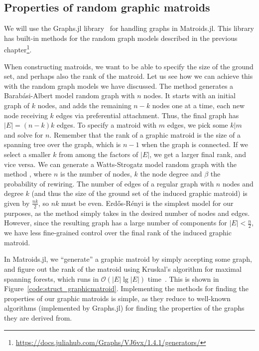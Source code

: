 \subsection{Properties of random graphic matroids}
We will use the Graphs.jl library~\cite{Graphs2021} for handling graphs in Matroids.jl. This library has built-in methods for the random graph models described in the previous chapter\footnote{\href{https://docs.juliahub.com/Graphs/VJ6vx/1.4.1/generators/}{https://docs.juliahub.com/Graphs/VJ6vx/1.4.1/generators/}}. 

When constructing matroids, we want to be able to specify the size of the ground set, and perhaps also the rank of the matroid. Let us see how we can achieve this with the random graph models we have discussed. The method  generates a Barabási-Albert model random graph with $n$ nodes. It starts with an initial graph of $k$ nodes, and adds the remaining $n-k$ nodes one at a time, each new node receiving $k$ edges via preferential attachment. Thus, the final graph has $|E| = (n-k)k$ edges. To specify a matroid with $m$ edges, we pick some $k|m$ and solve for $n$. Remember that the rank of a graphic matroid is the size of a spanning tree over the graph, which is $n-1$ when the graph is connected. If we select a smaller $k$ from among the factors of $|E|$, we get a larger final rank, and vice versa. We can generate a Watts-Strogatz model random graph with the method , where $n$ is the number of nodes, $k$ the node degree and $\beta$ the probability of rewiring. The number of edges of a regular graph with $n$ nodes and degree $k$ (and thus the size of the ground set of the induced graphic matroid) is given by $\frac{nk}{2}$, so $nk$ must be even. Erdős-Rényi is the simplest model for our purposes, as the method  simply takes in the desired number of nodes and edges. However, since the resulting graph has a large number of components for $|E| < \frac{n}{2}$, we have less fine-grained control over the final rank of the induced graphic matroid.

In Matroids.jl, we ``generate'' a graphic matroid by simply accepting some graph, and figure out the rank of the matroid using Kruskal's algorithm for maximal spanning forests, which runs in $\mathcal{O}(|E| \lg |E|)$ time~\cite{Cormen2009-zm}. This is shown in Figure~\ref{code:struct_graphicmatroid}. Implementing the methods for finding the properties of our graphic matroids is simple, as they reduce to well-known algorithms (implemented by Graphs.jl) for finding the properties of the graphs they are derived from. 

